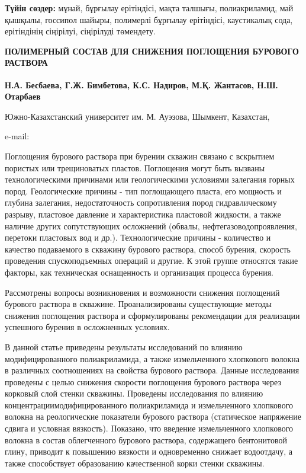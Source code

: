{\bfseries Түйін сөздер:} мұнай, бұрғылау ерітіндісі, мақта талшығы,
полиакриламид, май қышқылы, госсипол шайыры, полимерлі бұрғылау
ерітіндісі, каустикалық сода, ерітіндінің сіңірілуі, сіңірілуді
төмендету.

\begin{articleheader}
{\bfseries ПОЛИМЕРНЫЙ СОСТАВ ДЛЯ СНИЖЕНИЯ ПОГЛОЩЕНИЯ БУРОВОГО РАСТВОРА}

{\bfseries
Н.А. Бесбаева,
Г.Ж. Бимбетова\textsuperscript{\envelope },
К.С. Надиров,
М.Қ. Жантасов,
Н.Ш. Отарбаев
}
\end{articleheader}

\begin{affiliation}
Южно-Казахстанский университет им. М. Ауэзова, Шымкент, Казахстан,

e-mail: \href{mailto:gulmnaz@mail.ru}{}
\end{affiliation}

Поглощения бурового раствора при бурении скважин связано с вскрытием
пористых или трещиноватых пластов. Поглощения могут быть вызваны
технологическими причинами или геологическими условиями залегания горных
пород. Геологические причины - тип поглощающего пласта, его мощность и
глубина залегания, недостаточность сопротивления пород гидравлическому
разрыву, пластовое давление и характеристика пластовой жидкости, а также
наличие других сопутствующих осложнений (обвалы,
нефтегазоводопроявления, перетоки пластовых вод и др.). Технологические
причины - количество и качество подаваемого в скважину бурового
раствора, способ бурения, скорость проведения спускоподъемных операций и
другие. К этой группе относятся такие факторы, как техническая
оснащенность и организация процесса бурения.

Рассмотрены вопросы возникновения и возможности снижения поглощений
бурового раствора в скважине. Проанализированы существующие методы
снижения поглощения раствора и сформулированы рекомендации для
реализации успешного бурения в осложненных условиях.

В данной статье приведены результаты исследований по влиянию
модифицированного полиакриламида, а также измельченного хлопкового
волокна в различных соотношениях на свойства бурового раствора. Данные
исследования проведены с целью снижения скорости поглощения бурового
раствора через корковый слой стенки скважины. Проведены исследования по
влиянию концентрациимодифицированного полиакриламида и измельченного
хлопкового волокна на реологические показатели бурового раствора
(статическое напряжение сдвига и условная вязкость). Показано, что
введение измельченного хлопкового волокна в состав облегченного бурового
раствора, содержащего бентонитовой глину, приводит к повышению вязкости
и одновременно снижает водоотдачу, а также способствует образованию
качественной корки стенки скважины.

